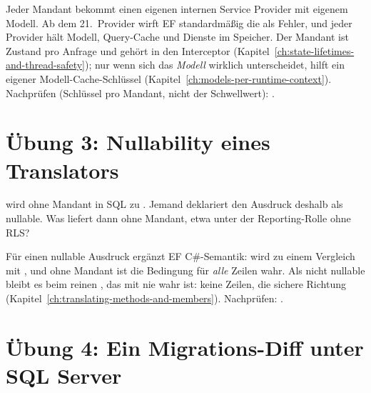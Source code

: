 \begin{note}[Lösung]
  Jeder Mandant bekommt einen eigenen internen Service Provider mit eigenem Modell. Ab dem
  21.~Provider wirft EF standardmäßig die
  als Fehler, und jeder Provider hält Modell, Query-Cache und Dienste im Speicher. Der Mandant ist
  Zustand pro Anfrage und gehört in den Interceptor
  (Kapitel~\ref{ch:state-lifetimes-and-thread-safety}); nur wenn sich das \emph{Modell} wirklich
  unterscheidet, hilft ein eigener Modell-Cache-Schlüssel (Kapitel~\ref{ch:models-per-runtime-context}).
  Nachprüfen (Schlüssel pro Mandant, nicht der Schwellwert): .
\end{note}

\section{Übung 3: Nullability eines Translators}

 wird ohne Mandant in SQL zu . Jemand
deklariert den Ausdruck deshalb als nullable. Was liefert
dann ohne Mandant, etwa unter der Reporting-Rolle ohne RLS?

\begin{note}[Lösung]
  Für einen nullable Ausdruck ergänzt EF C\#-Semantik: \code{<>} wird zu einem Vergleich mit
  , und ohne Mandant ist die Bedingung
  für \emph{alle} Zeilen wahr. Als nicht nullable bleibt es beim reinen \code{<>}, das mit
   nie wahr ist: keine Zeilen, die sichere Richtung
  (Kapitel~\ref{ch:translating-methods-and-members}).
  Nachprüfen: .
\end{note}

\section{Übung 4: Ein Migrations-Diff unter SQL Server}

